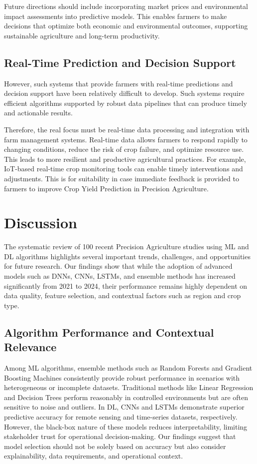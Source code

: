 \documentclass[conference]{IEEEtran}
\begin{document}
Future directions should include incorporating market prices and environmental impact assessments into predictive models. This enables farmers to make decisions that optimize both economic and environmental outcomes, supporting sustainable agriculture and long-term productivity.

\subsection{Real-Time Prediction and Decision Support}\label{AA}
However, such systems that provide farmers with real-time predictions and decision support have been relatively difficult to develop. Such systems require efficient algorithms supported by robust data pipelines that can produce timely and actionable results. 

Therefore, the real focus must be real-time data processing and integration with farm management systems. Real-time data allows farmers to respond rapidly to changing conditions, reduce the risk of crop failure, and optimize resource use. This leads to more resilient and productive agricultural practices. For example, IoT-based real-time crop monitoring tools can enable timely interventions and adjustments. This is for suitability in case immediate feedback is provided to farmers to improve Crop Yield Prediction in Precision Agriculture.

\section{Discussion}

The systematic review of 100 recent Precision Agriculture studies using ML and DL algorithms highlights several important trends, challenges, and opportunities for future research. Our findings show that while the adoption of advanced models such as DNNs, CNNs, LSTMs, and ensemble methods has increased significantly from 2021 to 2024, their performance remains highly dependent on data quality, feature selection, and contextual factors such as region and crop type.

\subsection{Algorithm Performance and Contextual Relevance}

Among ML algorithms, ensemble methods such as Random Forests and Gradient Boosting Machines consistently provide robust performance in scenarios with heterogeneous or incomplete datasets. Traditional methods like Linear Regression and Decision Trees perform reasonably in controlled environments but are often sensitive to noise and outliers. In DL, CNNs and LSTMs demonstrate superior predictive accuracy for remote sensing and time-series datasets, respectively. However, the black-box nature of these models reduces interpretability, limiting stakeholder trust for operational decision-making. Our findings suggest that model selection should not be solely based on accuracy but also consider explainability, data requirements, and operational context.
\end{document}
